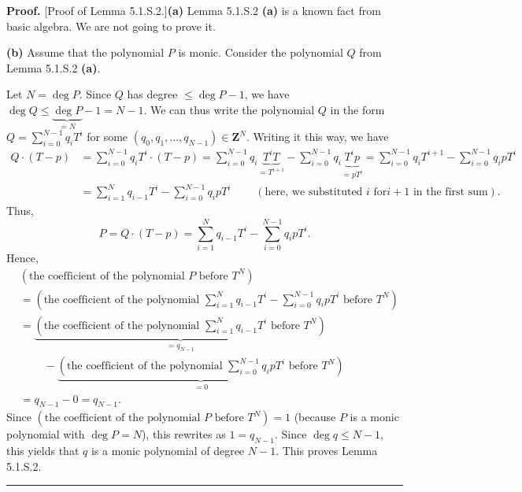 \documentclass[numbers=enddot,12pt,final,onecolumn,notitlepage]{scrartcl}%
\newenvironment{proof}[1][Proof]{\noindent\textbf{#1.} }{\ \rule{0.5em}{0.5em}}
\begin{document}
\begin{proof}
[Proof of Lemma 5.1.S.2.]\textbf{(a)} Lemma 5.1.S.2 \textbf{(a)} is a known
fact from basic algebra. We are not going to prove it.

\textbf{(b)} Assume that the polynomial $P$ is monic. Consider the polynomial
$Q$ from Lemma 5.1.S.2 \textbf{(a)}.

Let $N=\deg P$. Since $Q$ has degree $\leq\deg P-1$, we have $\deg
Q\leq\underbrace{\deg P}_{=N}-1=N-1$. We can thus write the polynomial $Q$ in
the form $Q=\sum\limits_{i=0}^{N-1}q_{i}T^{i}$ for some $\left(  q_{0}%
,q_{1},...,q_{N-1}\right)  \in\mathbf{Z}^{N}$. Writing it this way, we have%
\begin{align*}
Q\cdot\left(  T-p\right)   &  =\sum\limits_{i=0}^{N-1}q_{i}T^{i}\cdot\left(
T-p\right)  =\sum\limits_{i=0}^{N-1}q_{i}\underbrace{T^{i}T}_{=T^{i+1}}%
-\sum\limits_{i=0}^{N-1}q_{i}\underbrace{T^{i}p}_{=pT^{i}}=\sum\limits_{i=0}%
^{N-1}q_{i}T^{i+1}-\sum\limits_{i=0}^{N-1}q_{i}pT^{i}\\
&  =\sum\limits_{i=1}^{N}q_{i-1}T^{i}-\sum\limits_{i=0}^{N-1}q_{i}%
pT^{i}\ \ \ \ \ \ \ \ \ \ \left(  \text{here, we substituted }i\text{ for
}i+1\text{ in the first sum}\right)  .
\end{align*}
Thus,%
\[
P=Q\cdot\left(  T-p\right)  =\sum\limits_{i=1}^{N}q_{i-1}T^{i}-\sum
\limits_{i=0}^{N-1}q_{i}pT^{i}.
\]
Hence,%
\begin{align*}
&  \left(  \text{the coefficient of the polynomial }P\text{ before }%
T^{N}\right) \\
&  =\left(  \text{the coefficient of the polynomial }\sum\limits_{i=1}%
^{N}q_{i-1}T^{i}-\sum\limits_{i=0}^{N-1}q_{i}pT^{i}\text{ before }T^{N}\right)
\\
&  =\underbrace{\left(  \text{the coefficient of the polynomial }%
\sum\limits_{i=1}^{N}q_{i-1}T^{i}\text{ before }T^{N}\right)  }_{=q_{N-1}}\\
&  \ \ \ \ \ \ \ \ \ \ -\underbrace{\left(  \text{the coefficient of the
polynomial }\sum\limits_{i=0}^{N-1}q_{i}pT^{i}\text{ before }T^{N}\right)
}_{=0}\\
&  =q_{N-1}-0=q_{N-1}.
\end{align*}
Since $\left(  \text{the coefficient of the polynomial }P\text{ before }%
T^{N}\right)  =1$ (because $P$ is a monic polynomial with $\deg P=N$), this
rewrites as $1=q_{N-1}$. Since $\deg q\leq N-1$, this yields that $q$ is a
monic polynomial of degree $N-1$. This proves Lemma 5.1.S.2.
\end{proof}
\end{document}

